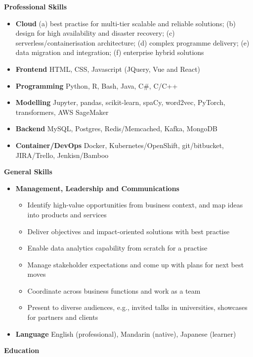 \documentclass[letterpaper,12pt]{article}[leftmargin=*]
\def \entryspacing {-0pt}
\renewcommand{\section}[2]{\vspace{5pt}
  \colorbox{secondary}{\color{white}\raggedbottom\normalsize\textbf{{#1}{\hspace{7pt}#2}}}
}
\newcommand{\resumeEntryStart}{\begin{itemize}[leftmargin=2.5mm]}
\newcommand{\resumeEntryEnd}{\end{itemize}\vspace{\entryspacing}}
\newcommand{\resumeItemListStart}{\begin{itemize}[leftmargin=4.5mm]}
\newcommand{\resumeItemListEnd}{\end{itemize}}
\newcommand{\resumeItem}[1]{
  \item\small{
    {#1 \vspace{-2pt}}
  }
}
\newcommand{\resumeEntryS}[2]{
  \item[]\small{
    \textbf{\color{primary}#1 }{ #2 \vspace{-6pt}}
  }
}
\begin{document}
\section{\faGears}{Professional Skills}
 \resumeEntryStart
  \resumeEntryS{Cloud} {(a) best practise for multi-tier scalable and reliable solutions; (b) design for high availability and disaster recovery; (c) serverless/containerisation architecture; (d) complex programme delivery; (e) data migration and integration; (f) enterprise hybrid solutions}
  \resumeEntryS{Frontend} {HTML, CSS, Javascript (JQuery, Vue and React)}
  \resumeEntryS{Programming} {Python, R, Bash, Java, C\#, C/C++}
  \resumeEntryS{Modelling} {Jupyter, pandas, scikit-learn, spaCy, word2vec, PyTorch, transformers, AWS SageMaker}
  \resumeEntryS{Backend} {MySQL, Postgres, Redis/Memcached, Kafka, MongoDB}
  \resumeEntryS{Container/DevOps} {Docker, Kubernetes/OpenShift, git/bitbucket, JIRA/Trello, Jenkisn/Bamboo}
 \resumeEntryEnd

\section{\faGears}{General Skills}

 \resumeEntryStart
  \resumeEntryS{Management, Leadership and Communications}{
   \resumeItemListStart
      \resumeItem {Identify high-value opportunities from business context, and map ideas into products and services}
      \resumeItem {Deliver objectives and impact-oriented solutions with best practise}
      \resumeItem {Enable data analytics capability from scratch for a practise}
      \resumeItem {Manage stakeholder expectations and come up with plans for next best moves}
      \resumeItem {Coordinate across business functions and work as a team}
      \resumeItem {Present to diverse audiences, e.g., invited talks in universities, showcases for partners and clients}
    \resumeItemListEnd}
  \resumeEntryS{Language} {English (professional), Mandarin (native), Japanese (learner)}
 \resumeEntryEnd

\section{\faGraduationCap}{Education}
\end{document}

